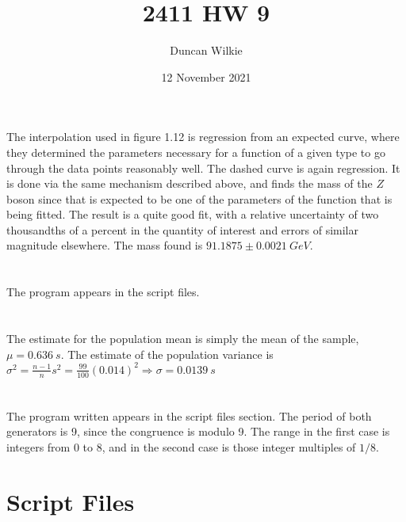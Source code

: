 \documentclass{article}
\title{2411 HW 9}
\author{Duncan Wilkie}
\date{12 November 2021}
\begin{document}
\maketitle

\section{}
The interpolation used in figure 1.12 is regression from an expected curve, where they determined the parameters necessary for a function of a given type to go through the data points reasonably well. The dashed curve is again regression. It is done via the same mechanism described above, and finds the mass of the $Z$ boson since that is expected to be one of the parameters of the function that is being fitted. The result is a quite good fit, with a relative uncertainty of two thousandths of a percent in the quantity of interest and errors of similar magnitude elsewhere. The mass found is $91.1875\pm \SI{ 0.0021}{GeV}$.

\section{}
The program appears in the script files.

\section{}
The estimate for the population mean is simply the mean of the sample, $\mu = \SI{0.636}{s}$. The estimate of the population variance is $\sigma^2 = \frac{n-1}{n}s^2=\frac{99}{100}(0.014)^2\Rightarrow \sigma=\SI{0.0139}{s}$

\section{}
The program written appears in the script files section. The period of both generators is 9, since the congruence is modulo 9. The range in the first case is integers from 0 to 8, and in the second case is those integer multiples of $1/8$.

\section{Script Files}
\end{document}

